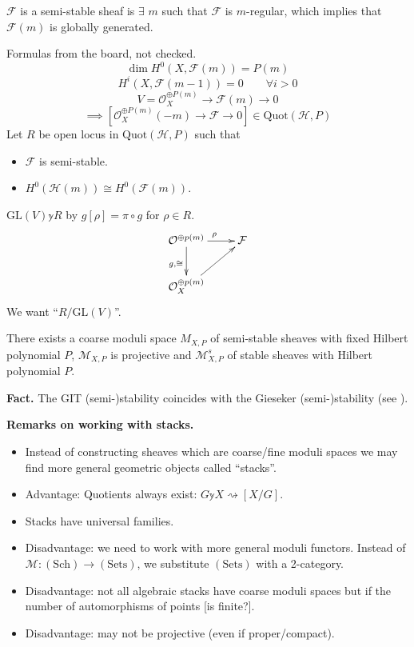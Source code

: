 $\mathcal{F}$ is a semi-stable sheaf is
$\exists $ $m$ such that
$\mathcal{F}$ is $m$-regular, which implies
that $\mathcal{F}(m)$ is globally
generated.

\medskip\noindent
Formulas from the board, not checked.
$$
\dim H^{0}(X,\mathcal{F}(m))=P(m)
$$
$$
H^{i}(X,\mathcal{F}(m-1))=0\qquad \forall i>0
$$
$$
V=\mathcal{O}_X^{\oplus P(m)}\to
\mathcal{F}(m)\to 0
$$
$$
\implies \left[ \mathcal{O}_X^{\oplus
P(m)}(-m) \to \mathcal{F} \to 0 \right]
\in \text{Quot}(\mathcal{H},P)
$$
Let $R$ be open locus in
$\text{Quot}(\mathcal{H},P)$ such that
\begin{itemize}
\item $\mathcal{F}$ is semi-stable.
\item $H^{0}(\mathcal{H}(m))\cong
H^{0}(\mathcal{F}(m))$.
\end{itemize}
$\text{GL}(V)\mathbb{y} R$ by $g[\rho]=\pi
\circ g$ for $\rho \in R$.
$$
\xymatrix{
\mathcal{O}^{\oplus
p(m)}\ar[r]^{\rho}\ar[d]_{g,\cong}&
\mathcal{F}\\
\mathcal{O}_X^{\oplus p(m)}\ar[ur]
}
$$
We want
``$R/\text{GL}(V)$''.

\begin{theorem}
\label{msos-label-010}
There exists a coarse moduli space $M_{X,P}$
of semi-stable sheaves with fixed
Hilbert polynomial $P$, $\mathcal{M}_{X,P}$
is projective and
$\mathcal{M}_{X,P}^s$ of stable sheaves with
Hilbert polynomial $P$.
\end{theorem}

\medskip\noindent
{\bf Fact.} The GIT (semi-)stability
coincides with the Gieseker
(semi-)stability (see \cite{HL}).

\medskip\noindent
{\bf Remarks on working with stacks.}

\begin{itemize}
\item Instead of constructing sheaves which
are coarse/fine moduli spaces we may
find more general geometric objects called
``stacks''.
\item Advantage: Quotients always exist:
$G \mathbb{y} X \rightsquigarrow [X/G]$.
\item Stacks have universal families.
\item Disadvantage: we need to work with more
general moduli functors. Instead
of $\mathcal{M}:(\text{Sch}) \to
(\text{Sets})$, we substitute $(\text{Sets})$
with a 2-category.
\item Disadvantage: not all algebraic stacks
have coarse moduli spaces but if
the number of automorphisms of points [is
finite?].
\item Disadvantage: may not be projective
(even if proper/compact).
\end{itemize}


